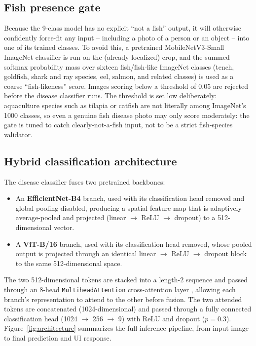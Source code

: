 \documentclass[conference]{IEEEtran}
\begin{document}
\subsection{Fish presence gate}
Because the 9-class model has no explicit ``not a fish'' output, it will otherwise confidently force-fit any input -- including a photo of a person or an object -- into one of its trained classes. To avoid this, a pretrained MobileNetV3-Small ImageNet classifier is run on the (already localized) crop, and the summed softmax probability mass over sixteen fish/fish-like ImageNet classes (tench, goldfish, shark and ray species, eel, salmon, and related classes) is used as a coarse ``fish-likeness'' score. Images scoring below a threshold of 0.05 are rejected before the disease classifier runs. The threshold is set low deliberately: aquaculture species such as tilapia or catfish are not literally among ImageNet's 1000 classes, so even a genuine fish disease photo may only score moderately: the gate is tuned to catch clearly-not-a-fish input, not to be a strict fish-species validator.

\subsection{Hybrid classification architecture}
The disease classifier fuses two pretrained backbones:

\begin{itemize}
\item An \textbf{EfficientNet-B4} \cite{efficientnet2019} branch, used with its classification head removed and global pooling disabled, producing a spatial feature map that is adaptively average-pooled and projected (linear $\rightarrow$ ReLU $\rightarrow$ dropout) to a 512-dimensional vector.
\item A \textbf{ViT-B/16} \cite{vit2021} branch, used with its classification head removed, whose pooled output is projected through an identical linear $\rightarrow$ ReLU $\rightarrow$ dropout block to the same 512-dimensional space.
\end{itemize}

The two 512-dimensional tokens are stacked into a length-2 sequence and passed through an 8-head \texttt{MultiheadAttention} cross-attention layer \cite{attention2017}, allowing each branch's representation to attend to the other before fusion. The two attended tokens are concatenated (1024-dimensional) and passed through a fully connected classification head (1024 $\rightarrow$ 256 $\rightarrow$ 9) with ReLU and dropout ($p=0.3$). Figure~\ref{fig:architecture} summarizes the full inference pipeline, from input image to final prediction and UI response.
\end{document}
